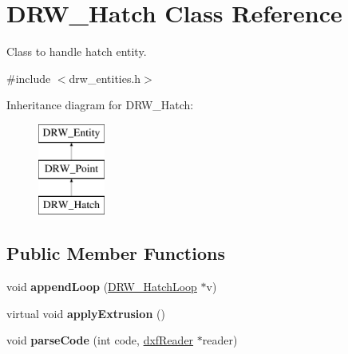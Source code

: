 \hypertarget{classDRW__Hatch}{\section{D\-R\-W\-\_\-\-Hatch Class Reference}
\label{classDRW__Hatch}
}


Class to handle hatch entity.  




{\ttfamily \#include $<$drw\-\_\-entities.\-h$>$}

Inheritance diagram for D\-R\-W\-\_\-\-Hatch\-:\begin{figure}[H]
\begin{center}
\leavevmode
\includegraphics[height=3.000000cm]{classDRW__Hatch}
\end{center}
\end{figure}
\subsection*{Public Member Functions}
\begin{DoxyCompactItemize}
\item 
\hypertarget{classDRW__Hatch_abc13c63ddb4758b14971df48f6f2fc1c}{void {\bfseries append\-Loop} (\hyperlink{classDRW__HatchLoop}{D\-R\-W\-\_\-\-Hatch\-Loop} $\ast$v)}\label{classDRW__Hatch_abc13c63ddb4758b14971df48f6f2fc1c}

\item 
\hypertarget{classDRW__Hatch_a5f4d83f519ba43ce26d6c9d91f6f0bc3}{virtual void {\bfseries apply\-Extrusion} ()}\label{classDRW__Hatch_a5f4d83f519ba43ce26d6c9d91f6f0bc3}

\item 
\hypertarget{classDRW__Hatch_a3dab474d443aedfd308d26bc63019d71}{void {\bfseries parse\-Code} (int code, \hyperlink{classdxfReader}{dxf\-Reader} $\ast$reader)}\label{classDRW__Hatch_a3dab474d443aedfd308d26bc63019d71}

\end{DoxyCompactItemize}

